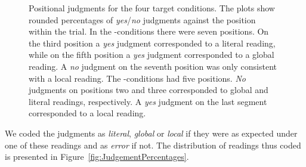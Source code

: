 \documentclass[fleqn,reqno,10pt,draft]{article}
\newcommand{\as}{\acro{as}}
\renewcommand{\es}{\acro{es}}
\begin{document}
\begin{figure}[]
{
\label{fig:ReadingsES-acc}
}


\caption{Positional judgments for the four target conditions. The
  plots show rounded percentages of \emph{yes}/\emph{no} judgments
  against the position within the trial. In the \as-conditions there
  were seven positions. On the third position a \emph{yes} judgment
  corresponded to a literal reading, while on the fifth position a
  \emph{yes} judgment corresponded to a global reading.  A \emph{no}
  judgment on the seventh position was only consistent with a local
  reading. The \es-conditions had five positions. \emph{No} judgments
  on positions two and three corresponded to global and literal
  readings, respectively. A \emph{yes} judgment on the last segment
  corresponded to a local reading.}
\label{fig:JudgmentsK2}
\end{figure}
%
We coded the judgments as {\it literal}, {\it global} or {\it local}
if they were as expected under one of these readings and as {\it
  error} if not. The distribution of readings thus coded is presented
in Figure~\ref{fig:JudgementPercentages}.
%
\end{document}
